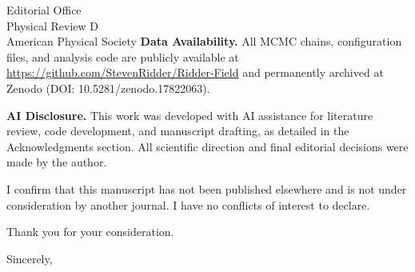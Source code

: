 \documentclass[11pt]{letter}
\begin{document}
\begin{letter}{Editorial Office\\Physical Review D\\American Physical Society}
\textbf{Data Availability.} All MCMC chains, configuration files, and analysis code are publicly available at \url{https://github.com/StevenRidder/Ridder-Field} and permanently archived at Zenodo (DOI: 10.5281/zenodo.17822063).

\textbf{AI Disclosure.} This work was developed with AI assistance for literature review, code development, and manuscript drafting, as detailed in the Acknowledgments section. All scientific direction and final editorial decisions were made by the author.

I confirm that this manuscript has not been published elsewhere and is not under consideration by another journal. I have no conflicts of interest to declare.

Thank you for your consideration.

\closing{Sincerely,}

\end{letter}
\end{document}
